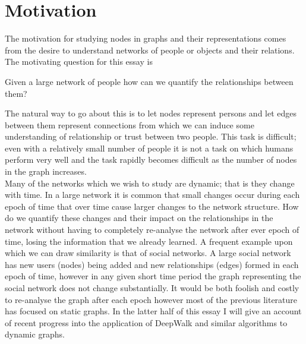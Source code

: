 \documentclass[a4paper]{article}
\begin{document}


\tableofcontents

\section{Motivation}
The motivation for studying nodes in graphs and their representations comes from the desire to understand networks of people or objects and their relations. The motivating question for this essay is
\begin{question}
  Given a large network of people how can we quantify the relationships between them?
\end{question}
The natural way to go about this is to let nodes represent persons and let edges
between them represent connections from which we can induce some understanding
of relationship or trust between two people. This task is difficult; even with a
relatively small number of people it is not a task on which humans perform very
well and the task rapidly becomes difficult as the number of nodes in the graph increases.\\
Many of the networks which we wish to study are dynamic; that is they change with time. In a large network it is common that small changes occur during each epoch of time that over time cause larger changes to the network structure. How do we quantify these changes and their impact on the relationships in the network without having to completely re-analyse the network after ever epoch of time, losing the information that we already learned. A frequent example upon which we can draw similarity is that of social networks. A large social network has new users (nodes) being added and new relationships (edges) formed in each epoch of time, however in any given short time period the graph representing the social network does not change substantially. It would be both foolish and costly to re-analyse the graph after each epoch however most of the previous literature has focused on static graphs. In the latter half of this essay I will give an account of recent progress into the application of DeepWalk and similar algorithms to dynamic graphs.
\end{document}
